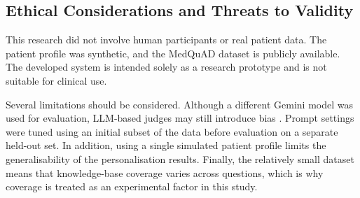 \subsection{Ethical Considerations and Threats to Validity}

This research did not involve human participants or real patient data. The patient profile was synthetic, and the MedQuAD dataset is publicly available. The developed system is intended solely as a research prototype and is not suitable for clinical use.

Several limitations should be considered. Although a different Gemini model was used for evaluation, LLM-based judges may still introduce bias \citep{zheng2023}. Prompt settings were tuned using an initial subset of the data before evaluation on a separate held-out set. In addition, using a single simulated patient profile limits the generalisability of the personalisation results. Finally, the relatively small dataset means that knowledge-base coverage varies across questions, which is why coverage is treated as an experimental factor in this study.
